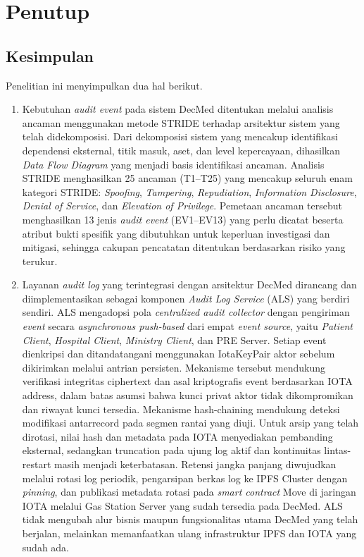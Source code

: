 \chapter{Penutup}

\section{Kesimpulan}

Penelitian ini menyimpulkan dua hal berikut.

\begin{enumerate}
    \item Kebutuhan \textit{audit event} pada sistem DecMed ditentukan melalui analisis ancaman menggunakan metode STRIDE terhadap arsitektur sistem yang telah didekomposisi. Dari dekomposisi sistem yang mencakup identifikasi dependensi eksternal, titik masuk, aset, dan level kepercayaan, dihasilkan \textit{Data Flow Diagram} yang menjadi basis identifikasi ancaman. Analisis STRIDE menghasilkan 25 ancaman (T1--T25) yang mencakup seluruh enam kategori STRIDE: \textit{Spoofing}, \textit{Tampering}, \textit{Repudiation}, \textit{Information Disclosure}, \textit{Denial of Service}, dan \textit{Elevation of Privilege}. Pemetaan ancaman tersebut menghasilkan 13 jenis \textit{audit event} (EV1--EV13) yang perlu dicatat beserta atribut bukti spesifik yang dibutuhkan untuk keperluan investigasi dan mitigasi, sehingga cakupan pencatatan ditentukan berdasarkan risiko yang terukur.

    \item Layanan \textit{audit log} yang terintegrasi dengan arsitektur DecMed dirancang dan diimplementasikan sebagai komponen \textit{Audit Log Service} (ALS) yang berdiri sendiri. ALS mengadopsi pola \textit{centralized audit collector} dengan pengiriman \textit{event} secara \textit{asynchronous push-based} dari empat \textit{event source}, yaitu \textit{Patient Client}, \textit{Hospital Client}, \textit{Ministry Client}, dan PRE Server. Setiap event dienkripsi dan ditandatangani menggunakan IotaKeyPair aktor sebelum dikirimkan melalui antrian persisten. Mekanisme tersebut mendukung verifikasi integritas ciphertext dan asal kriptografis event berdasarkan IOTA address, dalam batas asumsi bahwa kunci privat aktor tidak dikompromikan dan riwayat kunci tersedia. Mekanisme hash-chaining mendukung deteksi modifikasi antarrecord pada segmen rantai yang diuji. Untuk arsip yang telah dirotasi, nilai hash dan metadata pada IOTA menyediakan pembanding eksternal, sedangkan truncation pada ujung log aktif dan kontinuitas lintas-restart masih menjadi keterbatasan. Retensi jangka panjang diwujudkan melalui rotasi log periodik, pengarsipan berkas log ke IPFS Cluster dengan \textit{pinning}, dan publikasi metadata rotasi pada \textit{smart contract} Move di jaringan IOTA melalui Gas Station Server yang sudah tersedia pada DecMed. ALS tidak mengubah alur bisnis maupun fungsionalitas utama DecMed yang telah berjalan, melainkan memanfaatkan ulang infrastruktur IPFS dan IOTA yang sudah ada.
\end{enumerate}

